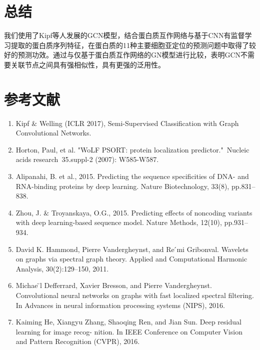\documentclass[a4paper,UTF8]{article}
\begin{document}
\section{总结}

我们使用了Kipf等人发展的GCN模型，结合蛋白质互作网络与基于CNN有监督学习提取的蛋白质序列特征，在蛋白质的11种主要细胞亚定位的预测问题中取得了较好的预测功效。通过与仅基于蛋白质互作网络的GN模型进行比较，表明GCN不需要关联节点之间具有强相似性，具有更强的泛用性。

\section{参考文献}
\begin{enumerate}[(1)]
	\item Kipf $\&$ Welling (ICLR 2017), Semi-Supervised Classification with Graph Convolutional Networks.
	\item Horton, Paul, et al. "WoLF PSORT: protein localization predictor." Nucleic acids research 35.suppl-2 (2007): W585-W587.
	\item Alipanahi, B. et al., 2015. Predicting the sequence specificities of DNA- and RNA-binding proteins by deep learning. Nature Biotechnology, 33(8), pp.831–838.
	\item Zhou, J. $\&$ Troyanskaya, O.G., 2015. Predicting effects of noncoding variants with deep learning-based sequence model. Nature Methods, 12(10), pp.931–934.
	\item David K. Hammond, Pierre Vandergheynst, and Re ́mi Gribonval. Wavelets on graphs via spectral graph theory. Applied and Computational Harmonic Analysis, 30(2):129–150, 2011.
	\item Michae ̈l Defferrard, Xavier Bresson, and Pierre Vandergheynst. Convolutional neural networks on graphs with fast localized spectral filtering. In Advances in neural information processing systems (NIPS), 2016.
	\item 
	Kaiming He, Xiangyu Zhang, Shaoqing Ren, and Jian Sun. Deep residual learning for image recog- nition. In IEEE Conference on Computer Vision and Pattern Recognition (CVPR), 2016.

\end{enumerate}
 
%
%
\end{document}
